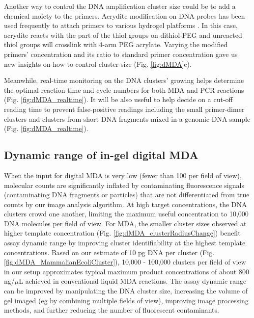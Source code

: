 Another way to control the DNA amplification cluster size could be to add a chemical moiety to the primers. Acrydite modification on DNA probes has been used frequently to attach primers to various hydrogel platforms \cite{Mitra:1999ty}. In this case, acrydite reacts with the part of the thiol groups on dithiol-PEG and unreacted thiol groups will crosslink with 4-arm PEG acrylate. Varying the modified primers' concentration and its ratio to standard primer concentration gave us new insights on how to control cluster size (Fig. \ref{fig:dMDA}c). 

Meanwhile, real-time monitoring on the DNA clusters' growing helps determine the optimal reaction time and cycle numbers for both MDA and PCR reactions (Fig. \ref{fig:dMDA_realtime}). It will be also useful to help decide on a cut-off reading time to prevent false-positive readings including the small primer-dimer clusters and clusters from short DNA fragments mixed in a genomic DNA sample (Fig. \ref{fig:dMDA_realtime}).

\subsection{Dynamic range of in-gel digital MDA}
When the input for digital MDA is very low (fewer than 100 per field of view), molecular counts are significantly inflated by contaminating fluorescence signals (contaminating DNA fragments or particles) that are not differentiated from true counts by our image analysis algorithm. At high target concentrations, the DNA clusters crowd one another, limiting the maximum useful concentration to 10,000 DNA molecules per field of view. For MDA, the smaller cluster sizes observed at higher template concentration (Fig. \ref{fig:dMDA_clusterRadiusChange}) benefit assay dynamic range by improving cluster identifiability at the highest template concentrations. Based on our estimate of 10 pg DNA per cluster (Fig. \ref{fig:dMDA_MammalianEcoliCluster}), 10,000 - 100,000 clusters per field of view in our setup approximates typical maximum product concentrations of about 800 ng\slash $\mu$L achieved in conventional liquid MDA reactions. The assay dynamic range can be improved by manipulating the DNA cluster size, increasing the volume of gel imaged (eg by combining multiple fields of view), improving image processing methods, and further reducing the number of fluorescent contaminants. 

